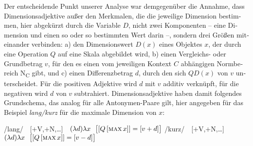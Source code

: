 \documentclass[output=paper,colorlinks,citecolor=brown]{langscibook}
\begin{document}
\begin{otherlanguage}{german}
Der entscheidende Punkt unserer Analyse war demgegenüber die Annahme, dass Dimensionsadjektive außer den Merkmalen, die die jeweilige Dimension bestimmen, hier abgekürzt durch die Variable $D$, nicht zwei Komponenten -- eine Dimension und einen so oder so bestimmten Wert darin --, sondern drei Größen miteinander verbinden: a) den Dimensionswert $D(x)$ eines Objektes $x$, der durch eine Operation $Q$ auf eine Skala abgebildet wird, b) einen Vergleichs- oder Grundbetrag $v$, für den es einen vom jeweiligen Kontext $C$ abhängigen Normbereich N\textsubscript{C} gibt, und c) einen Differenzbetrag $d$, durch den sich $QD(x)$ von $v$ unterscheidet. Für die positiven Adjektive wird $d$ mit $v$ additiv verknüpft, für die negativen wird $d$ von $v$ subtrahiert. Dimensionsadjektive haben damit folgendes Grundschema, das analog für alle Antonymen-Paare gilt, hier angegeben für das Beispiel \textit{lang/kurz} für die maximale Dimension von $x$:

\ea 
\ea /lang/ \,\, [$+$V,$+$N,\dots] \,\, $(\lambda d) \lambda x \,\,\,\, \big\lbrack [ Q\, [ \textsc{max}\, x ]] = [v + d ] \big\rbrack$
\label{ex:18a}
\ex /kurz/ \,\, [$+$V,$+$N,\dots] \,\, $(\lambda d) \lambda x \,\,\,\, \big\lbrack [ Q\, [ \textsc{max}\, x ]] = [v - d ] \big\rbrack$
\label{ex:18b}
\z
\label{ex:18}
\z


\end{otherlanguage}
\end{document}
